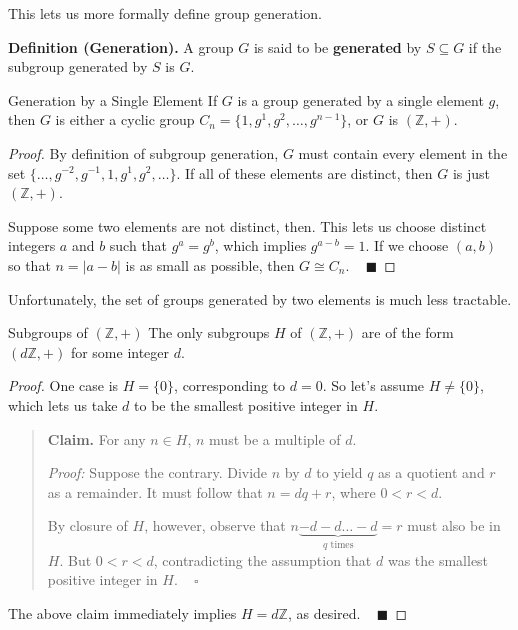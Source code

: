 This lets us more formally define group generation.

\textbf{Definition (Generation).} A group $G$ is said to be \textbf{generated} by $S \subseteq G$ if the subgroup generated by $S$ is $G$.

\begin{theorem}{Generation by a Single Element}
    If $G$ is a group generated by a single element $g$, then $G$ is either a cyclic group $C_n = \{1, g^1, g^2, \dots, g^{n - 1}\}$, or $G$ is $(\mathbb{Z}, +)$.
\end{theorem}

\begin{proof}
    By definition of subgroup generation, $G$ must contain every element in the set $\{\dots, g^{-2}, g^{-1}, 1, g^1, g^2, \dots\}$.  If all of these elements are distinct, then $G$ is just $(\mathbb{Z}, +)$.

    Suppose some two elements are not distinct, then.  This lets us choose distinct integers $a$ and $b$ such that $g^a = g^b$, which implies $g^{a - b} = 1$.  If we choose $(a, b)$ so that $n = |a - b|$ is as small as possible, then $G \cong C_n$. ~ $\blacksquare$
\end{proof}

Unfortunately, the set of groups generated by two elements is much less tractable.

\begin{theorem}{Subgroups of $\mathbf{(\mathbb{Z}, +)}$}
    The only subgroups $H$ of $(\mathbb{Z}, +)$ are of the form $(d\mathbb{Z}, +)$ for some integer $d$.
\end{theorem}

\begin{proof}
    One case is $H = \{0\}$, corresponding to $d = 0$.  So let's assume $H \neq \{0\}$, which lets us take $d$ to be the smallest positive integer in $H$.
    \begin{quote}
        \textbf{Claim.} For any $n \in H$, $n$ must be a multiple of $d$.

        \emph{Proof:} Suppose the contrary.  Divide $n$ by $d$ to yield $q$ as a quotient and $r$ as a remainder.  It must follow that $n = dq + r$, where $0 < r < d$.

        By closure of $H$, however, observe that $n \underbrace{- d - d \dots - d}_{q \text{ times}} = r$ must also be in $H$.  But $0 < r < d$, contradicting the assumption that $d$ was the smallest positive integer in $H$. ~ $\square$
    \end{quote}
    The above claim immediately implies $H = d\mathbb{Z}$, as desired. ~ $\blacksquare$
\end{proof}


